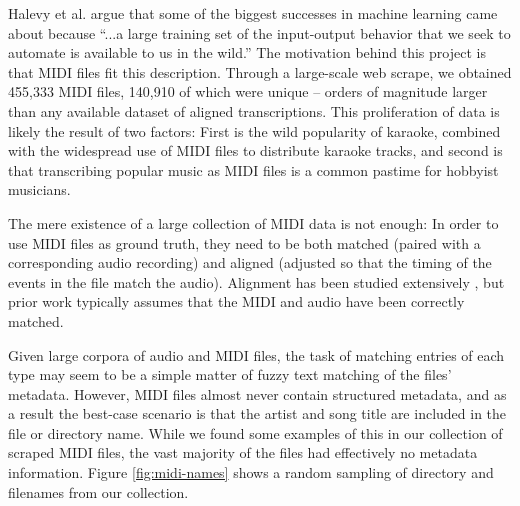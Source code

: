 \documentclass{article}
\begin{document}
Halevy et al. \cite{halevy2009unreasonable} argue that some of the biggest successes in machine learning came about because ``...a large training set of the input-output behavior that we seek to automate is available to us in the wild.''
The motivation behind this project is that MIDI files fit this description.
Through a large-scale web scrape, we obtained 455,333 MIDI files, 140,910 of which were unique -- orders of magnitude larger than any available dataset of aligned transcriptions.
This proliferation of data is likely the result of two factors: First is the wild popularity of karaoke, combined with the widespread use of MIDI files to distribute karaoke tracks, and second is that transcribing popular music as MIDI files is a common pastime for hobbyist musicians.


The mere existence of a large collection of MIDI data is not enough:  In order to use MIDI files as ground truth, they need to be both matched (paired with a corresponding audio recording) and aligned (adjusted so that the timing of the events in the file match the audio).
Alignment has been studied extensively  \cite{ewert2012towards, turetsky2003ground}, but prior work typically assumes that the MIDI and audio have been correctly matched.

Given large corpora of audio and MIDI files, the task of matching entries of each type may seem to be a simple matter of fuzzy text matching of the files' metadata.
However, MIDI files almost never contain structured metadata, and as a result the best-case scenario is that the artist and song title are included in the file or directory name.
While we found some examples of this in our collection of scraped MIDI files, the vast majority of the files had effectively no metadata information.
Figure \ref{fig:midi-names} shows a random sampling of directory and filenames from our collection.
\end{document}

